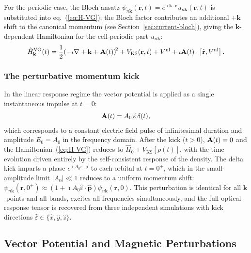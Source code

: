For the periodic case, the Bloch ansatz
$\psi_{n\mathbf{k}}(\mathbf{r},t)
= e^{\imath\mathbf{k}\cdot\mathbf{r}}u_{n\mathbf{k}}(\mathbf{r},t)$
is substituted into eq.~(\ref{eq:H-VG}); the Bloch factor
contributes an additional $+\mathbf{k}$ shift to the canonical
momentum (see Section~\ref{sec:current-bloch}), giving the
$\mathbf{k}$-dependent Hamiltonian for the cell-periodic part
$u_{n\mathbf{k}}$:
\begin{equation}
  \hat{H}^\mathrm{VG}_\mathbf{k}(t)
  = \frac{1}{2}\!\left(-\imath\nabla + \mathbf{k} + \mathbf{A}(t)\right)^{\!2}
  + V_\mathrm{KS}(\mathbf{r},t)
  + V^{\mathrm{nl}}
  + \imath\mathbf{A}(t)\cdot\left[\hat{\mathbf{r}},V^{\mathrm{nl}}\right].
  \label{eq:H-VG-k}
\end{equation}

\subsubsection{The perturbative momentum kick}
\label{sec:delta-kick}

In the linear response regime the vector potential is applied as a
single instantaneous impulse at $t=0$:
\begin{equation}
  \mathbf{A}(t) = A_0\,\hat{\varepsilon}\,\delta(t),
  \label{eq:delta-kick}
\end{equation}
which corresponds to a constant electric field pulse of infinitesimal
duration and amplitude $E_0 = A_0$ in the frequency
domain.\cite{yabana-bertsch-1996}
After the kick ($t>0$), $\mathbf{A}(t)=0$ and the Hamiltonian~(\ref{eq:H-VG})
reduces to $\hat{H}_0 + V_\mathrm{KS}[\rho(t)]$, with the time
evolution driven entirely by the self-consistent response of the
density.
The delta kick imparts a phase $e^{\imath A_0\hat{\varepsilon}\cdot\hat{\mathbf{p}}}$
to each orbital at $t=0^+$, which in the small-amplitude limit
$|A_0|\ll 1$ reduces to a uniform momentum shift:
$\psi_{n\mathbf{k}}(\mathbf{r},0^+)
\approx (1 + \imath A_0\hat{\varepsilon}\cdot\hat{\mathbf{p}})
\psi_{n\mathbf{k}}(\mathbf{r},0)$.
This perturbation is identical for all $\mathbf{k}$-points and all
bands, excites all frequencies simultaneously, and the full optical
response tensor is recovered from three independent simulations with
kick directions $\hat{\varepsilon}\in\{\hat{x},\hat{y},\hat{z}\}$.


\subsection{Vector Potential and Magnetic Perturbations}
\label{sec:vector-potential}

